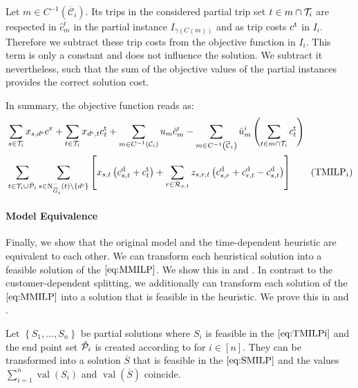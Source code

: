 Let ${m\in C^{-1}\left(\overline{\mathcal{C}}_i\right)}$. Its trips in the considered partial trip set ${t\in m\cap\mathcal{T}_i}$ are respected in $\hat{c}^{\operatorname{r}}_m$ in the partial instance $I_{\gamma(C(m))}$ and as trip costs $c^{\operatorname{t}}$ in $I_i$. Therefore we subtract these trip costs from the objective function in $I_i$. This term is only a constant and does not influence the solution. We subtract it nevertheless, such that the sum of the objective values of the partial instances provides the correct solution cost.

In summary, the objective function reads as:
\begin{align}
	& \sum_{s\in\Ti} x_{s,\de}\cv + \sum_{t\in\Ti} x_{\ds, t}\ct_t + \sum_{m\in C^{-1}\left(\mathcal{C}_i\right)} u_m \hat{c}^{\operatorname{r}}_m - \sum_{m\in C^{-1}\left(\overline{\mathcal{C}}_i\right)} \hat{u}^i_m \left(\sum_{t\in m\cap\Ti} \ct_t\right)\nonumber \\
	& \sum_{t\in\Ti\cup\Phat_i}\sum_{s\in\Ninoi(t)\backslash\left\{\ds\right\}}\left[x_{s,t}\left(\cd_{s,t}+\ct_t\right)+\sum_{r\in\Rst}z_{s,r,t}\left(\cd_{s,r}+\cd_{r,t}-\cd_{s,t}\right)\right] \tag{$\operatorname{TMILP}_i$} \label{eq:TMILPi}
\end{align}

\paragraph{Model Equivalence} \parfill

Finally, we show that the original model and the time-dependent heuristic are equivalent to each other. We can transform each heuristical solution into a feasible solution of the $\eqref{eq:MMILP}$. We show this in  and . In contrast to the customer-dependent splitting, we additionally can transform each solution of the $\eqref{eq:MMILP}$ into a solution that is feasible in the heuristic. We prove this in  and .

\begin{theorem}
\label{thm:equivalence_TMILP_SMILP}

Let $\left\{S_1,\dots,S_n\right\}$ be partial solutions where $S_i$ is feasible in the $\eqref{eq:TMILPi}$ and the end point set $\hat{\mathcal{P}}_i$ is created according to  for ${i\in[n]}$. They can be transformed into a solution $\overline{S}$ that is feasible in the $\eqref{eq:SMILP}$ and the values ${\sum_{i=1}^n \operatorname{val}\left(S_i\right)}$ and ${\operatorname{val}(\overline{S})}$ coincide.

\end{theorem}

